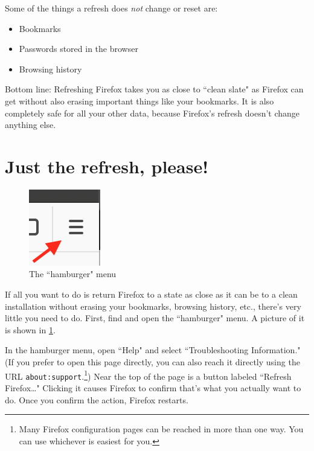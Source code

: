 \documentclass[fontsize=11pt]{article}
\begin{document}
Some of the things a refresh does \emph{not} change or reset are:
\begin{itemize}
	\item{Bookmarks}
	\item{Passwords stored in the browser}
	\item{Browsing history}
\end{itemize}


Bottom line:  Refreshing Firefox takes you as close to ``clean slate" as Firefox can get without also erasing important things like your bookmarks.  It is also completely safe for all your other data, because Firefox's refresh doesn't change anything else.





\section{Just the refresh, please!}\label{section:just-the-refresh-please}

\begin{figure}[h]
	\centering
	\includegraphics{images/hamburger-menu.png}
	\caption{The ``hamburger" menu}
	\label{fig:hamburger-menu}
\end{figure}

If all you want to do is return Firefox to a state as close as it can be to a clean installation without erasing your bookmarks, browsing history, etc., there's very little you need to do.  First, find and open the ``hamburger" menu.  A picture of it is shown in \cref{fig:hamburger-menu}.

In the hamburger menu, open ``Help" and select ``Troubleshooting Information."  (If you prefer to open this page directly, you can also reach it directly using the URL \texttt{about:support}.\footnote{Many Firefox configuration pages can be reached in more than one way.  You can use whichever is easiest for you.})  Near the top of the page is a button labeled ``Refresh Firefox\ldots{}"  Clicking it causes Firefox to confirm that's what you actually want to do.  Once you confirm the action, Firefox restarts.
\end{document}
